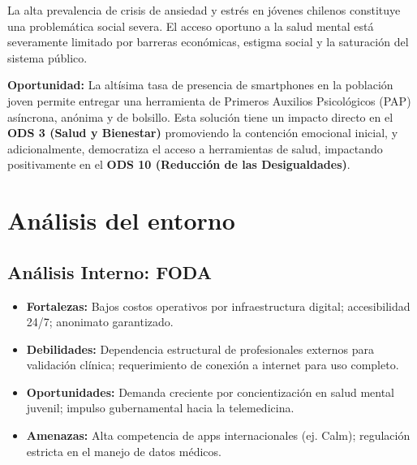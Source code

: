 \documentclass[12pt,letterpaper]{article}
\begin{document}
La alta prevalencia de crisis de ansiedad y estrés en jóvenes chilenos constituye una problemática social severa. El acceso oportuno a la salud mental está severamente limitado por barreras económicas, estigma social y la saturación del sistema público.

\textbf{Oportunidad:} La altísima tasa de presencia de smartphones en la población joven permite entregar una herramienta de Primeros Auxilios Psicológicos (PAP) asíncrona, anónima y de bolsillo. Esta solución tiene un impacto directo en el \textbf{ODS 3 (Salud y Bienestar)} promoviendo la contención emocional inicial, y adicionalmente, democratiza el acceso a herramientas de salud, impactando positivamente en el \textbf{ODS 10 (Reducción de las Desigualdades)}.

\section{Análisis del entorno}

\subsection{Análisis Interno: FODA}
\begin{itemize}[leftmargin=*]
    \item \textbf{Fortalezas:} Bajos costos operativos por infraestructura digital; accesibilidad 24/7; anonimato garantizado.
    \item \textbf{Debilidades:} Dependencia estructural de profesionales externos para validación clínica; requerimiento de conexión a internet para uso completo.
    \item \textbf{Oportunidades:} Demanda creciente por concientización en salud mental juvenil; impulso gubernamental hacia la telemedicina.
    \item \textbf{Amenazas:} Alta competencia de apps internacionales (ej. Calm); regulación estricta en el manejo de datos médicos.
\end{itemize}
\end{document}
